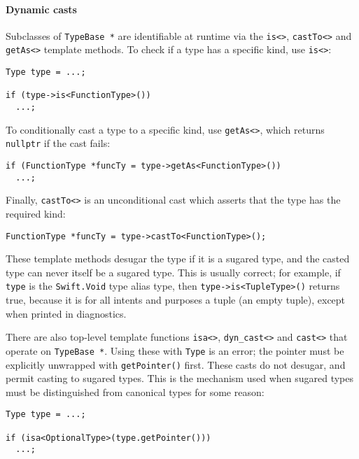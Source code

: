\documentclass[../generics]{subfiles}
\begin{document}
\paragraph{Dynamic casts}
Subclasses of \texttt{TypeBase *} are identifiable at runtime via the \verb|is<>|, \verb|castTo<>| and \verb|getAs<>| template methods. To check if a type has a specific kind, use \verb|is<>|:
\begin{Verbatim}
Type type = ...;

if (type->is<FunctionType>())
  ...;
\end{Verbatim}
To conditionally cast a type to a specific kind, use \verb|getAs<>|, which returns \verb|nullptr| if the cast fails:
\begin{Verbatim}
if (FunctionType *funcTy = type->getAs<FunctionType>())
  ...;
\end{Verbatim}
Finally, \verb|castTo<>| is an unconditional cast which asserts that the type has the required kind:
\begin{Verbatim}
FunctionType *funcTy = type->castTo<FunctionType>();
\end{Verbatim}
These template methods desugar the type if it is a sugared type, and the casted type can never itself be a sugared type. This is usually correct; for example, if \texttt{type} is the \texttt{Swift.Void} type alias type, then \texttt{type->is<TupleType>()} returns true, because it is for all intents and purposes a tuple (an empty tuple), except when printed in diagnostics.

There are also top-level template functions \verb|isa<>|, \verb|dyn_cast<>| and \verb|cast<>| that operate on \texttt{TypeBase *}. Using these with \texttt{Type} is an error; the pointer must be explicitly unwrapped with \texttt{getPointer()} first. These casts do not desugar, and permit casting to sugared types. This is the mechanism used when sugared types must be distinguished from canonical types for some reason:
\begin{Verbatim}
Type type = ...;

if (isa<OptionalType>(type.getPointer()))
  ...;
\end{Verbatim}
\end{document}

